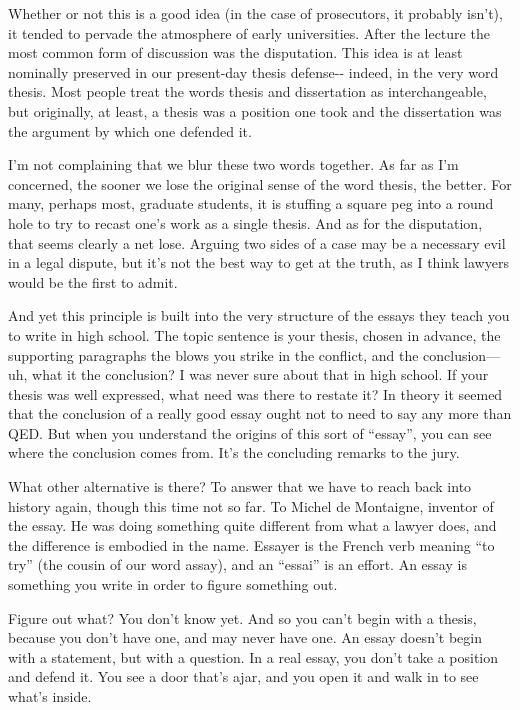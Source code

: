 \documentclass[12pt]{book}
\begin{document}
Whether or not this is a good idea (in the case of prosecutors, it
probably isn't), it tended to pervade the atmosphere of early
universities. After the lecture the most common form of discussion was
the disputation. This idea is at least nominally preserved in our
present-day thesis defense-\/- indeed, in the very word thesis. Most
people treat the words thesis and dissertation as interchangeable, but
originally, at least, a thesis was a position one took and the
dissertation was the argument by which one defended it.

I'm not complaining that we blur these two words together. As far as I'm
concerned, the sooner we lose the original sense of the word thesis, the
better. For many, perhaps most, graduate students, it is stuffing a
square peg into a round hole to try to recast one's work as a single
thesis. And as for the disputation, that seems clearly a net lose.
Arguing two sides of a case may be a necessary evil in a legal dispute,
but it's not the best way to get at the truth, as I think lawyers would
be the first to admit.

And yet this principle is built into the very structure of the essays
they teach you to write in high school. The topic sentence is your
thesis, chosen in advance, the supporting paragraphs the blows you
strike in the conflict, and the conclusion--- uh, what it the
conclusion? I was never sure about that in high school. If your thesis
was well expressed, what need was there to restate it? In theory it
seemed that the conclusion of a really good essay ought not to need to
say any more than QED. But when you understand the origins of this sort
of ``essay'', you can see where the conclusion comes from. It's the
concluding remarks to the jury.

What other alternative is there? To answer that we have to reach back
into history again, though this time not so far. To Michel de Montaigne,
inventor of the essay. He was doing something quite different from what
a lawyer does, and the difference is embodied in the name. Essayer is
the French verb meaning ``to try'' (the cousin of our word assay), and
an ``essai'' is an effort. An essay is something you write in order to
figure something out.

Figure out what? You don't know yet. And so you can't begin with a
thesis, because you don't have one, and may never have one. An essay
doesn't begin with a statement, but with a question. In a real essay,
you don't take a position and defend it. You see a door that's ajar, and
you open it and walk in to see what's inside.
\end{document}
